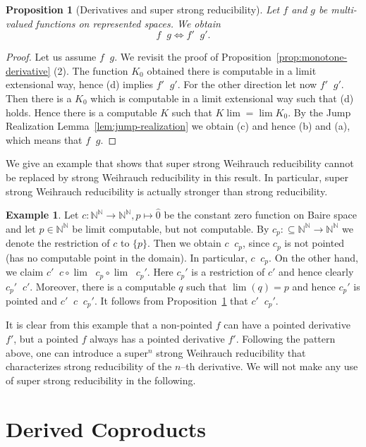 \documentclass[a4paper]{amsart}
\def\IN{{\mathbb{N}}}
\def\In{\subseteq}
\def\Baire{{\IN^\IN}}
\def\leqSW{\mathop{\leq_{\mathrm{sW}}}}
\def\leqSSW{\mathop{\leq_{\mathrm{ssW}}}}
\def\equivSW{\mathop{\equiv_{\mathrm{sW}}}}
\def\nleqW{\mathop{\not\leq_{\mathrm{W}}}}
\def\nleqSW{\mathop{\not\leq_{\mathrm{sW}}}}
\def\nleqSSW{\mathop{\not\leq_{\mathrm{ssW}}}}
\newtheorem{proposition}[theorem]{Proposition}
\theoremstyle{definition}
\newtheorem{example}[theorem]{Example}
\begin{document}
\begin{proposition}[Derivatives and super strong reducibility]
\label{prop:derivative-super-strong}
Let $f$ and $g$ be multi-valued functions on represented spaces. We obtain
\[f\leqSW g\iff f'\leqSSW g'.\]
\end{proposition}
\begin{proof}
Let us assume $f\leqSW g$. 
We revisit the proof of Proposition~\ref{prop:monotone-derivative} (2). 
The function $K_0$ obtained there is computable in a limit extensional way, hence (d) implies $f'\leqSSW g'$.
For the other direction let now $f'\leqSSW g'$. Then there is a $K_0$ which is computable
in a limit extensional way such that (d) holds. Hence there is a computable $K$ such that
$K \lim=\lim K_0$. By the Jump Realization Lemma~\ref{lem:jump-realization} we obtain (c) and hence (b) and (a),
which means that $f\leqSW g$.
\end{proof}

We give an example that shows that super strong Weihrauch reducibility cannot be replaced
by strong Weihrauch reducibility in this result. In particular, super strong Weihrauch reducibility
is actually stronger than strong reducibility.

\begin{example}
\label{ex:strong-super-strong}
Let $c:\Baire\to\Baire,p\mapsto\widehat{0}$ be the constant zero function on Baire space
and let $p\in\Baire$ be limit computable, but not computable. By $c_p:\In\Baire\to\Baire$
we denote the restriction of $c$ to $\{p\}$. Then we obtain $c\nleqW c_p$, since $c_p$
is not pointed (has no computable point in the domain). In particular,
$c\nleqSW c_p$. 
On the other hand, we claim
$c'\equivSW c\circ\lim\equivSW c_p\circ\lim\equivSW c_p'$.
Here $c_p'$ is a restriction of $c'$ and hence clearly $c_p'\leqSSW c'$.
Moreover, there is a computable $q$ such that $\lim(q)=p$ and hence $c_p'$ is pointed
and $c'\equivSW c\leqSW c_p'$.
It follows from Proposition~\ref{prop:derivative-super-strong} that $c'\nleqSSW c_p'$.
\end{example}

It is clear from this example that a non-pointed $f$ can have a pointed derivative $f'$,
but a pointed $f$ always has a pointed derivative $f'$.
Following the pattern above, one can introduce a super$^n$ strong Weihrauch reducibility
that characterizes strong reducibility of the $n$--th derivative.
We will not make any use of super strong reducibility in the following.


\section{Derived Coproducts}
\end{document}
